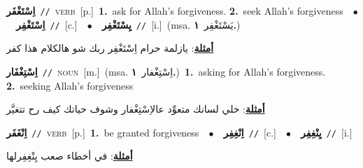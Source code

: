 \documentclass[10pt,a4paper,twoside]{article} %
\begin{document}
\begin{multicols}{2}
{\setlength\topsep{0pt}\textbf{\foreignlanguage{arabic}{اِسْتَغْفَر}}\ {\color{gray}\texttt{//}\color{black}}\ \textsc{verb}\ [p.]\ \textbf{1.}~ask for Allah's forgiveness.  \textbf{2.}~seek Allah's forgiveness\ \ $\bullet$\ \ \setlength\topsep{0pt}\textbf{\foreignlanguage{arabic}{اِسْتَغْفِر}}\ {\color{gray}\texttt{//}\color{black}}\ [c.]\ \ $\bullet$\ \ \setlength\topsep{0pt}\textbf{\foreignlanguage{arabic}{يِسْتَغْفِر}}\ {\color{gray}\texttt{//}\color{black}}\ [i.]\ \color{gray}(msa. \foreignlanguage{arabic}{يَسْتَغْفِر}~\foreignlanguage{arabic}{\textbf{١.}})\color{black}\  \begin{flushright}\color{gray}\foreignlanguage{arabic}{\textbf{\underline{\foreignlanguage{arabic}{أمثلة}}}: يازلمة حرام اِسْتَغْفِر ربك شو هالكلام هذا كفر}\end{flushright}\color{black}} \vspace{2mm}

{\setlength\topsep{0pt}\textbf{\foreignlanguage{arabic}{اِسْتِغْفَار}}\ {\color{gray}\texttt{//}\color{black}}\ \textsc{noun}\ [m.]\ \color{gray}(msa. \foreignlanguage{arabic}{اِسْتِغْفار}~\foreignlanguage{arabic}{\textbf{١.}})\color{black}\ \textbf{1.}~asking for Allah's forgiveness.  \textbf{2.}~seeking Allah's forgiveness\  \begin{flushright}\color{gray}\foreignlanguage{arabic}{\textbf{\underline{\foreignlanguage{arabic}{أمثلة}}}: خلي لسانك متعوِّد عالاِسْتِغْفار وشوف حياتك كيف رح تتغيَّر}\end{flushright}\color{black}} \vspace{2mm}

{\setlength\topsep{0pt}\textbf{\foreignlanguage{arabic}{اِنْغَفَر}}\ {\color{gray}\texttt{//}\color{black}}\ \textsc{verb}\ [p.]\ \textbf{1.}~be granted forgiveness\ \ $\bullet$\ \ \setlength\topsep{0pt}\textbf{\foreignlanguage{arabic}{اِنْغِفِر}}\ {\color{gray}\texttt{//}\color{black}}\ [c.]\ \ $\bullet$\ \ \setlength\topsep{0pt}\textbf{\foreignlanguage{arabic}{يِنْغِفِر}}\ {\color{gray}\texttt{//}\color{black}}\ [i.]\  \begin{flushright}\color{gray}\foreignlanguage{arabic}{\textbf{\underline{\foreignlanguage{arabic}{أمثلة}}}: في أخطاء صعب يِنْغِفِرلها}\end{flushright}\color{black}} \vspace{2mm}


\end{multicols}
\end{document}

